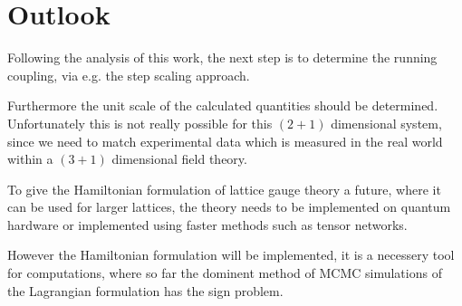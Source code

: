 \section{Outlook}
Following the analysis of this work, the next step is to determine the running coupling, via e.g. the step scaling approach.\cite{crippa2024}

Furthermore the unit scale of the calculated quantities should be determined. Unfortunately this is not really possible for this $(2+1)$ dimensional system, since we need to match experimental data which is measured in the real world within a $(3+1)$ dimensional field theory.

To give the Hamiltonian formulation of lattice gauge theory a future, where it can be used for larger lattices, the theory needs to be implemented on quantum hardware or implemented using faster methods such as tensor networks.\cite{crippa2024, wu2025accurategaugeinvarianttensornetwork, Singh_2011}

However the Hamiltonian formulation will be implemented, it is a necessery tool for computations, where so far the dominent method of MCMC simulations of the Lagrangian formulation has the sign problem. \cite{Garofalo:2024VV}
